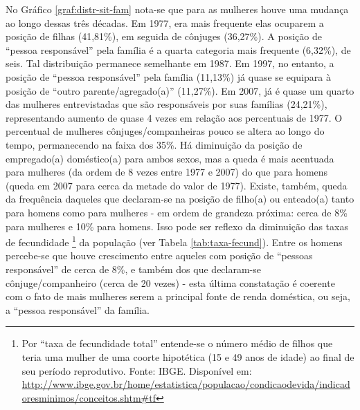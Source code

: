 \clearpage
No Gráfico \ref{graf:distr-sit-fam} nota-se que para as mulheres houve uma mudança ao longo dessas três décadas. Em 1977, era mais frequente elas ocuparem a posição de filhas (41,81\%), em seguida de cônjuges (36,27\%). A posição de ``pessoa responsável'' pela família é a quarta categoria mais frequente (6,32\%), de seis. Tal distribuição permanece semelhante em 1987. Em 1997, no entanto, a posição de ``pessoa responsável'' pela família (11,13\%) já quase se equipara à posição de ``outro parente/agregado(a)'' (11,27\%). Em 2007, já é quase um quarto das mulheres entrevistadas que são responsáveis por suas famílias (24,21\%), representando aumento de quase 4 vezes em relação aos percentuais de 1977. O percentual de mulheres cônjuges/companheiras pouco se altera ao longo do tempo, permanecendo na faixa dos 35\%. Há diminuição da posição de empregado(a) doméstico(a) para ambos sexos, mas a queda é mais acentuada para mulheres (da ordem de 8 vezes entre 1977 e 2007) do que para homens (queda em 2007 para cerca da metade do valor de 1977). Existe, também, queda da frequência daqueles que declaram-se na posição de filho(a) ou enteado(a) tanto para homens como para mulheres - em ordem de grandeza próxima: cerca de 8\% para mulheres e 10\% para homens. Isso pode ser reflexo da diminuição das taxas de fecundidade
\footnote{Por ``taxa de fecundidade total'' entende-se o número médio de filhos que teria uma mulher de uma coorte hipotética (15 e 49 anos de idade) ao final de seu período reprodutivo. Fonte: IBGE. Disponível em: \url{http://www.ibge.gov.br/home/estatistica/populacao/condicaodevida/indicadoresminimos/conceitos.shtm\#tf}} da população (ver Tabela \ref{tab:taxa-fecund}). Entre os homens percebe-se que houve crescimento entre aqueles com posição de ``pessoas responsável'' de cerca de 8\%, e também dos que declaram-se cônjuge/companheiro (cerca de 20 vezes) - esta última constatação é coerente com o fato de mais mulheres serem a principal fonte de renda doméstica, ou seja, a ``pessoa responsável'' da família.

